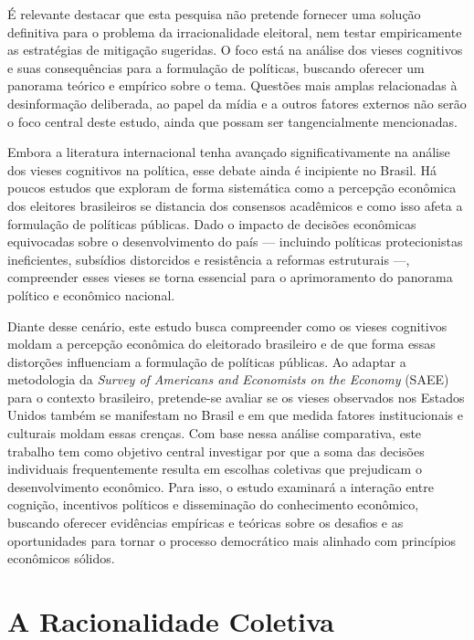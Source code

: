 É relevante destacar que esta pesquisa não pretende fornecer uma solução definitiva para o problema da irracionalidade eleitoral, nem testar empiricamente as estratégias de mitigação sugeridas. O foco está na análise dos vieses cognitivos e suas consequências para a formulação de políticas, buscando oferecer um panorama teórico e empírico sobre o tema. Questões mais amplas relacionadas à desinformação deliberada, ao papel da mídia e a outros fatores externos não serão o foco central deste estudo, ainda que possam ser tangencialmente mencionadas.

Embora a literatura internacional tenha avançado significativamente na análise dos vieses cognitivos na política, esse debate ainda é incipiente no Brasil. Há poucos estudos que exploram de forma sistemática como a percepção econômica dos eleitores brasileiros se distancia dos consensos acadêmicos e como isso afeta a formulação de políticas públicas. Dado o impacto de decisões econômicas equivocadas sobre o desenvolvimento do país — incluindo políticas protecionistas ineficientes, subsídios distorcidos e resistência a reformas estruturais —, compreender esses vieses se torna essencial para o aprimoramento do panorama político e econômico nacional.

Diante desse cenário, este estudo busca compreender como os vieses cognitivos moldam a percepção econômica do eleitorado brasileiro e de que forma essas distorções influenciam a formulação de políticas públicas. Ao adaptar a metodologia da \textit{Survey of Americans and Economists on the Economy} (SAEE) para o contexto brasileiro, pretende-se avaliar se os vieses observados nos Estados Unidos também se manifestam no Brasil e em que medida fatores institucionais e culturais moldam essas crenças. Com base nessa análise comparativa, este trabalho tem como objetivo central investigar por que a soma das decisões individuais frequentemente resulta em escolhas coletivas que prejudicam o desenvolvimento econômico. Para isso, o estudo examinará a interação entre cognição, incentivos políticos e disseminação do conhecimento econômico, buscando oferecer evidências empíricas e teóricas sobre os desafios e as oportunidades para tornar o processo democrático mais alinhado com princípios econômicos sólidos.

\section{A Racionalidade Coletiva} %

